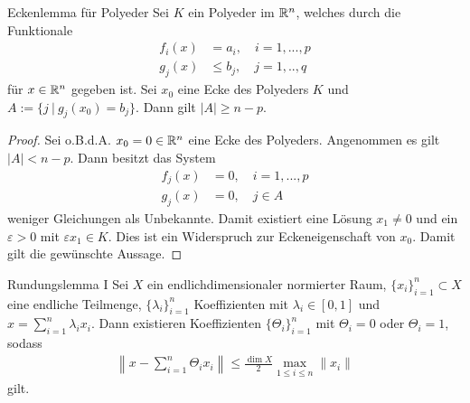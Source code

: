 \begin{genericthm}{Eckenlemma für Polyeder}\label{thm:polyeder_lemma}
	Sei $ K $ ein Polyeder im $ \mathbb{R}^n $, welches durch die Funktionale
	\begin{align*}
		f_{i}(x) &= a_i, \quad i = 1,...,p\\
		g_{j}(x) &\leq b_j, \quad j = 1,..,q
	\end{align*}
	für $ x \in \mathbb{R}^n $ gegeben ist. 
	Sei $ x_0 $ eine Ecke des Polyeders $ K $ und $ A:= \{ j \ | \ g_j(x_0) = b_j \} $.
	Dann gilt $ | A | \geq n -p $.
\end{genericthm}

\begin{proof}
	Sei o.B.d.A. $ x_0 = 0 \in \mathbb{R}^n $ eine Ecke des Polyeders. 
	Angenommen es gilt $ |A| < n - p $.
	Dann besitzt das System
	\begin{align*}
		f_j(x) &= 0, \quad i = 1,...,p\\
		g_j(x) &= 0, \quad j \in A
	\end{align*}
	weniger Gleichungen als Unbekannte. Damit existiert eine Lösung $ x_1 \neq 0 $ und  ein $ \varepsilon > 0  $ mit $ \varepsilon x_1 \in K $.
	Dies ist ein Widerspruch zur Eckeneigenschaft von $ x_0 $.
	Damit gilt die gewünschte Aussage.
\end{proof}

\begin{genericthm}{Rundungslemma I}\label{thm:rounding_lemma}
	Sei $ X $ ein endlichdimensionaler normierter Raum, $ \{ x_i \}_{i=1}^n \subset X $ eine endliche Teilmenge, $ \{ \lambda_i\}_{i = 1}^n $ Koeffizienten mit $ \lambda_i \in [0,1] $
	und $ x = \sum_{i= 1}^n \lambda_i x_i $.
	Dann existieren Koeffizienten $ \{\Theta_i\}_{i=1}^n $ mit $ \Theta_i = 0 $ oder $ \Theta_i = 1 $, sodass 
	\begin{align}\label{eq:rounding_off_coefficients}
		\left\| x - \sum \limits_{i=1}^n \Theta_i x_i \right\| \leq \frac{\dim  X }{2} \max_{1 \leq i \leq n} \| x_i \|
	\end{align}
	gilt.
\end{genericthm}


